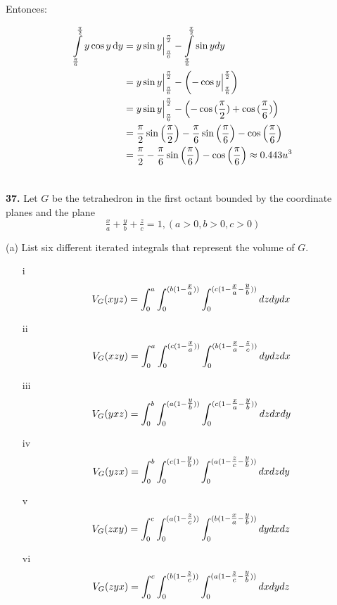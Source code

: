 \documentclass[11pt]{report}
\begin{document}
Entonces:

\begin{equation}
\begin{split}
        \int \limits_{\frac{\pi}{6}}^{\frac{\pi}{2}} y
        \cos{y} \, \text dy
        &= y \sin{y} \Big|_{\frac{\pi}{6}}^{\frac{\pi}{2}}
        - \int \limits_{\frac{\pi}{6}}^{\frac{\pi}{2}} \sin{y} dy \\ \notag
        &= y \sin{y} \Big|_{\frac{\pi}{6}}^{\frac{\pi}{2}} - \left( - \cos{y} \Big|_{\frac{\pi}{6}}^{\frac{\pi}{2}} \right) \\ \notag
        &= y \sin{y} \Big|_{\frac{\pi}{6}}^{\frac{\pi}{2}} - \left( - \cos{(\frac{\pi}{2})} + \cos{(\frac{\pi}{6})} \right) \\ \notag
        &= \frac{\pi}{2} \sin{\left( \frac{\pi}{2} \right)} - \frac{\pi}{6} \sin{\left( \frac{\pi}{6} \right)}
        - \cos{\left( \frac{\pi}{6} \right)} \\ \notag
        &= \frac{\pi}{2} - \frac{\pi}{6} \sin{\left( \frac{\pi}{6} \right)}
        - \cos{\left( \frac{\pi}{6} \right)} \approx 0.443 u^3 \\ \notag
\end{split}
\end{equation}

\textbf{37.} Let $G$ be the tetrahedron in the first octant bounded by the
coordinate planes and the plane \\

\[ \tfrac{x}{a} + \tfrac{y}{b} + \tfrac{z}{c} = 1, (a > 0, b > 0, c > 0) \]

(a) List six different iterated integrals that represent the volume of $G$. \\
\begin{itemize}
	\item[i] \[V_G(xyz)=\int_0^{a}\int_0^{(b(1-\tfrac{x}{a}))}\int_0^{(c(1-\tfrac{x}{a}-\tfrac{y}{b}))}dzdydx\]
	\item[ii] \[V_G(xzy)=\int_0^{a}\int_0^{(c(1-\tfrac{x}{a}))}\int_0^{(b(1-\tfrac{x}{a}-\tfrac{z}{c}))}dydzdx\]
	\item[iii] \[V_G(yxz)=\int_0^{b}\int_0^{(a(1-\tfrac{y}{b}))}\int_0^{(c(1-\tfrac{x}{a}-\tfrac{y}{b}))}dzdxdy\]
	\item[iv] \[V_G(yzx)=\int_0^{b}\int_0^{(c(1-\tfrac{y}{b}))}\int_0^{(a(1-\tfrac{z}{c}-\tfrac{y}{b}))}dxdzdy\]
	\item[v] \[V_G(zxy)=\int_0^{c}\int_0^{(a(1-\tfrac{z}{c}))}\int_0^{(b(1-\tfrac{x}{a}-\tfrac{y}{b}))}dydxdz\]
	\item[vi] \[V_G(zyx)=\int_0^{c}\int_0^{(b(1-\tfrac{z}{c}))}\int_0^{(a(1-\tfrac{z}{c}-\tfrac{y}{b}))}dxdydz\]
\end{itemize}
\end{document}
